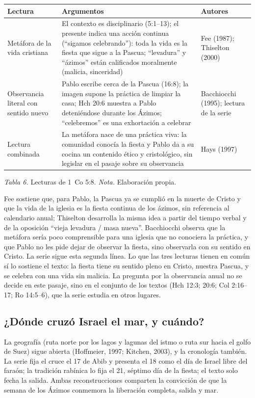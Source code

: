 \documentclass[11pt,letterpaper]{article}
\begin{document}
\begin{center}\begin{minipage}{\linewidth}\centering\small\renewcommand{\arraystretch}{1.25}
\begin{tabular}{@{}L{3.3cm}L{6.6cm}L{5.7cm}@{}}
\toprule
\textbf{Lectura} & \textbf{Argumentos} & \textbf{Autores} \\ \midrule
Metáfora de la vida cristiana & El contexto es disciplinario (5:1--13); el presente indica una acción continua (``sigamos celebrando''): toda la vida es la fiesta que sigue a la Pascua; ``levadura'' y ``ázimos'' están calificados moralmente (malicia, sinceridad) & Fee (1987); Thiselton (2000) \\
Observancia literal con sentido nuevo & Pablo escribe cerca de la Pascua (16:8); la imagen supone la práctica de limpiar la casa; Hch 20:6 muestra a Pablo deteniéndose durante los Ázimos; ``celebremos'' es una exhortación a celebrar & Bacchiocchi (1995); lectura de la serie \\
Lectura combinada & La metáfora nace de una práctica viva: la comunidad conocía la fiesta y Pablo da a su cocina un contenido ético y cristológico, sin legislar en el pasaje sobre su observancia & Hays (1997) \\
\bottomrule
\end{tabular}\par\nopagebreak
{\footnotesize\color{sepia}\textit{Tabla 6.} Lecturas de 1~Co 5:8. \textit{Nota.} Elaboración propia.}
\end{minipage}\end{center}

Fee sostiene que, para Pablo, la Pascua ya se cumplió en la muerte de Cristo y que la vida de la iglesia es la fiesta continua de los ázimos, sin referencia al calendario anual; Thiselton desarrolla la misma idea a partir del tiempo verbal y de la oposición ``vieja levadura / masa nueva''. Bacchiocchi observa que la metáfora sería poco comprensible para una iglesia que no conociera la práctica, y que Pablo no les pide dejar de observar la fiesta, sino observarla con su sentido en Cristo. La serie sigue esta segunda línea. Lo que las tres lecturas tienen en común sí lo sostiene el texto: la fiesta tiene su sentido pleno en Cristo, nuestra Pascua, y se celebra con una vida sin malicia. La pregunta por la observancia anual no se decide en este pasaje, sino en el conjunto de los textos (Hch 12:3; 20:6; Col 2:16--17; Ro 14:5--6), que la serie estudia en otros lugares.

\subsection{¿Dónde cruzó Israel el mar, y cuándo?}
La geografía (ruta norte por los lagos y lagunas del istmo o ruta sur hacia el golfo de Suez) sigue abierta (Hoffmeier, 1997; Kitchen, 2003), y la cronología también. La serie fija el cruce el 17 de Abib y presenta el 18 como el día de Israel libre del faraón; la tradición rabínica lo fija el 21, séptimo día de la fiesta; el texto solo fecha la salida. Ambas reconstrucciones comparten la convicción de que la semana de los Ázimos conmemora la liberación completa, salida y mar.
\end{document}
